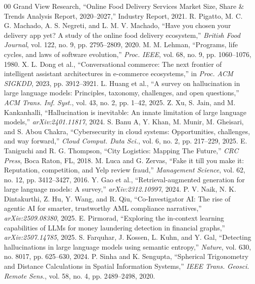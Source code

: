 \documentclass[conference]{IEEEtran}
\begin{document}
\begin{thebibliography}{00}
 Grand View Research, ``Online Food Delivery Services Market Size, Share \& Trends Analysis Report, 2020--2027,'' Industry Report, 2021.
 R. Pigatto, M. C. G. Machado, A. S. Negreti, and L. M. V. Machado, ``Have you chosen your delivery app yet? A study of the online food delivery ecosystem,'' \textit{British Food Journal}, vol. 122, no. 9, pp. 2795--2809, 2020.
 M. M. Lehman, ``Programs, life cycles, and laws of software evolution,'' \textit{Proc. IEEE}, vol. 68, no. 9, pp. 1060--1076, 1980.
 X. L. Dong et al., ``Conversational commerce: The next frontier of intelligent assistant architectures in e-commerce ecosystems,'' in \textit{Proc. ACM SIGKDD}, 2023, pp. 3912--3921.
 L. Huang et al., ``A survey on hallucination in large language models: Principles, taxonomy, challenges, and open questions,'' \textit{ACM Trans. Inf. Syst.}, vol. 43, no. 2, pp. 1--42, 2025.
 Z. Xu, S. Jain, and M. Kankanhalli, ``Hallucination is inevitable: An innate limitation of large language models,'' \textit{arXiv:2401.11817}, 2024.
 S. Banu A, Y. Khan, M. Munir, M. Gheisari, and S. Abou Chakra, ``Cybersecurity in cloud systems: Opportunities, challenges, and way forward,'' \textit{Cloud Comput. Data Sci.}, vol. 6, no. 2, pp. 217--229, 2025.
 E. Taniguchi and R. G. Thompson, ``City Logistics: Mapping The Future,'' \textit{CRC Press}, Boca Raton, FL, 2018.
 M. Luca and G. Zervas, ``Fake it till you make it: Reputation, competition, and Yelp review fraud,'' \textit{Management Science}, vol. 62, no. 12, pp. 3412--3427, 2016.
 Y. Gao et al., ``Retrieval-augmented generation for large language models: A survey,'' \textit{arXiv:2312.10997}, 2024.
 P. V. Naik, N. K. Dintakurthi, Z. Hu, Y. Wang, and R. Qiu, ``Co-Investigator AI: The rise of agentic AI for smarter, trustworthy AML compliance narratives,'' \textit{arXiv:2509.08380}, 2025.
 E. Pirmorad, ``Exploring the in-context learning capabilities of LLMs for money laundering detection in financial graphs,'' \textit{arXiv:2507.14785}, 2025.
 S. Farquhar, J. Kossen, L. Kuhn, and Y. Gal, ``Detecting hallucinations in large language models using semantic entropy,'' \textit{Nature}, vol. 630, no. 8017, pp. 625--630, 2024.
 P. Sinha and K. Sengupta, ``Spherical Trigonometry and Distance Calculations in Spatial Information Systems,'' \textit{IEEE Trans. Geosci. Remote Sens.}, vol. 58, no. 4, pp. 2489--2498, 2020.

\end{thebibliography}
\end{document}
